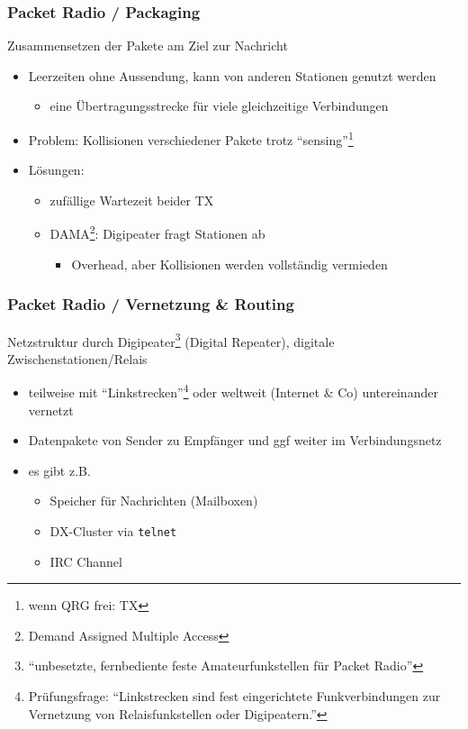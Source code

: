 \begin{frame}
    \frametitle{Packet Radio / Packaging}

    Zusammensetzen der Pakete am Ziel zur Nachricht \\[1em]

    \begin{itemize}
        \item Leerzeiten ohne Aussendung, kann von anderen Stationen genutzt werden
        \begin{itemize}      
            \item eine Übertragungsstrecke für viele gleichzeitige Verbindungen
        \end{itemize}
        \item Problem: Kollisionen verschiedener Pakete trotz
              ``sensing''\footnote{wenn QRG frei: TX}
        \item Lösungen:
        \begin{itemize}
            \item zufällige Wartezeit beider TX
            \item DAMA\footnote{Demand Assigned Multiple Access}: Digipeater fragt Stationen ab
            \begin{itemize}
                \item Overhead, aber Kollisionen werden vollständig vermieden
            \end{itemize}
        \end{itemize}
    \end{itemize}

\end{frame}

\begin{frame}
    \frametitle{Packet Radio / Vernetzung \& Routing}

    Netzstruktur durch Digipeater\footnote{``unbesetzte, fernbediente feste
    Amateurfunkstellen für Packet Radio''} (Digital Repeater), digitale
    Zwischenstationen/Relais

    \begin{itemize}
        \item teilweise mit ``Linkstrecken''\footnote{Prüfungsfrage:
              ``Linkstrecken sind fest eingerichtete Funkverbindungen zur
              Vernetzung von Relaisfunkstellen oder Digipeatern.''} oder
              weltweit (Internet \& Co) untereinander vernetzt
        \item Datenpakete von Sender zu Empfänger und ggf weiter im Verbindungsnetz
        \item es gibt z.B.
        \begin{itemize}
            \item Speicher für Nachrichten (Mailboxen)
            \item DX-Cluster via \texttt{telnet}
            \item IRC Channel
        \end{itemize}
    \end{itemize}

\end{frame}

